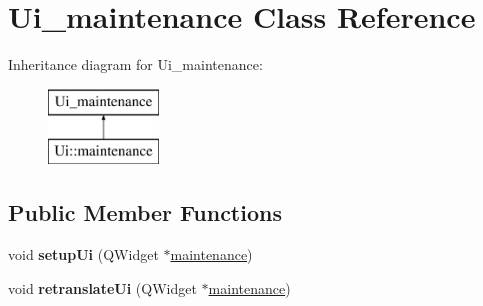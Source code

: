 \hypertarget{class_ui__maintenance}{}\section{Ui\+\_\+maintenance Class Reference}
\label{class_ui__maintenance}
Inheritance diagram for Ui\+\_\+maintenance\+:\begin{figure}[H]
\begin{center}
\leavevmode
\includegraphics[height=2.000000cm]{class_ui__maintenance}
\end{center}
\end{figure}
\subsection*{Public Member Functions}
\begin{DoxyCompactItemize}
\item 
\mbox{\label{class_ui__maintenance_a664c5b70f69f736c4607afa83106c54d}} 
void {\bfseries setup\+Ui} (Q\+Widget $\ast$\mbox{\hyperlink{classmaintenance}{maintenance}})
\item 
\mbox{\label{class_ui__maintenance_a488b009956e9bc6bb32e67aca9de7a2b}} 
void {\bfseries retranslate\+Ui} (Q\+Widget $\ast$\mbox{\hyperlink{classmaintenance}{maintenance}})
\end{DoxyCompactItemize}
